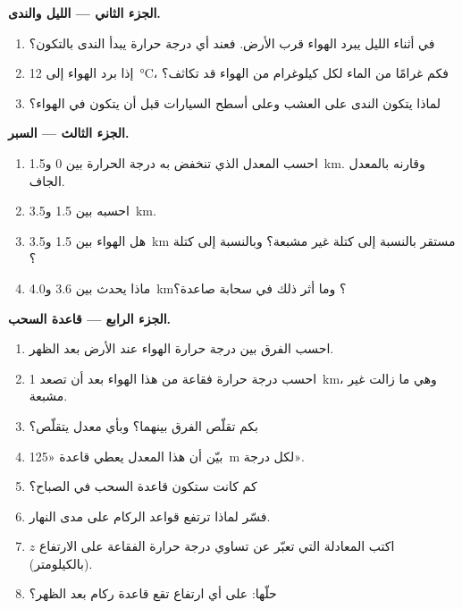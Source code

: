 \begin{problem}
\medskip
\noindent\textbf{الجزء الثاني --- الليل والندى.}
\begin{enumerate}[resume]
  \item في أثناء الليل يبرد الهواء قرب الأرض. فعند أي درجة حرارة يبدأ الندى
        بالتكون؟
  \item إذا برد الهواء إلى \qty{12}{\degreeCelsius}، فكم غرامًا من الماء لكل
        كيلوغرام من الهواء قد تكاثف؟
  \item لماذا يتكون الندى على العشب وعلى أسطح السيارات قبل أن يتكون في
        الهواء؟
\end{enumerate}

\medskip
\noindent\textbf{الجزء الثالث --- السبر.}
\begin{enumerate}[resume]
  \item احسب المعدل الذي تنخفض به درجة الحرارة بين
        \num{0} و\qty{1.5}{km}. وقارنه بالمعدل الجاف.
  \item احسبه بين \num{1.5} و\qty{3.5}{km}.
  \item هل الهواء بين \num{1.5} و\qty{3.5}{km} مستقر بالنسبة إلى كتلة
        غير مشبعة؟ وبالنسبة إلى كتلة ؟
  \item ماذا يحدث بين \num{3.6} و\qty{4.0}{km}؟ وما أثر ذلك في سحابة
        صاعدة؟
\end{enumerate}

\medskip
\noindent\textbf{الجزء الرابع --- قاعدة السحب.}
\begin{enumerate}[resume]
  \item احسب الفرق بين درجة حرارة الهواء  عند الأرض بعد
        الظهر.
  \item احسب درجة حرارة فقاعة من هذا الهواء  بعد أن تصعد
        \qty{1}{km}، وهي ما زالت غير مشبعة.
  \item بكم تقلّص الفرق بينهما؟ وبأي معدل
        يتقلّص؟
  \item بيّن أن هذا المعدل يعطي قاعدة «\qty{125}{m} لكل درجة».
  \item كم كانت ستكون قاعدة السحب في الصباح؟
  \item فسّر لماذا ترتفع قواعد الركام على مدى النهار.
  \item اكتب المعادلة التي تعبّر عن تساوي درجة حرارة الفقاعة  على
        الارتفاع $z$ (بالكيلومتر).
  \item حلّها: على أي ارتفاع تقع قاعدة ركام بعد الظهر؟
\end{enumerate}
\end{problem}
